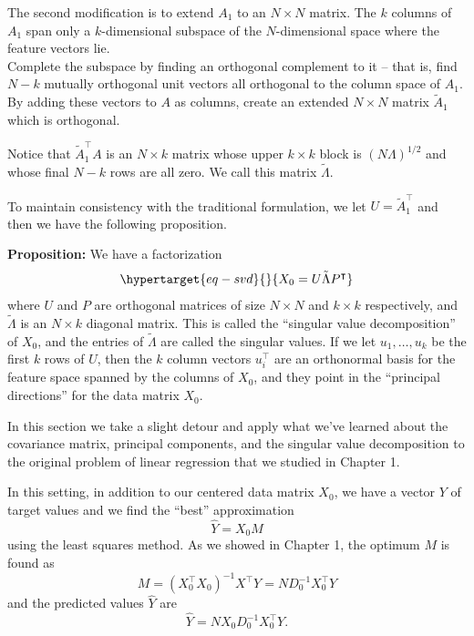 \documentclass[
  11pt,
  letterpaper,
]{scrbook}
\theoremstyle{plain}
\theoremstyle{remark}
\begin{document}
The second modification is to extend \(A_{1}\) to an \(N\times N\)
matrix. The \(k\) columns of \(A_1\) span only a \(k\)-dimensional
subspace of the \(N\)-dimensional space where the feature vectors lie.\\
Complete the subspace by finding an orthogonal complement to it -- that
is, find \(N-k\) mutually orthogonal unit vectors all orthogonal to the
column space of \(A_1\). By adding these vectors to \(A\) as columns,
create an extended \(N\times N\) matrix \(\tilde{A}_1\) which is
orthogonal.

Notice that \(\tilde{A}_{1}^{\intercal}A\) is an \(N\times k\) matrix
whose upper \(k\times k\) block is \((N\Lambda)^{1/2}\) and whose final
\(N-k\) rows are all zero. We call this matrix \(\tilde{\Lambda}\).

To maintain consistency with the traditional formulation, we let
\(U=\tilde{A}_{1}^{\intercal}\) and then we have the following
proposition.

\textbf{Proposition:} We have a factorization
\begin{equation}\protect\hypertarget{eq-svd}{}{
X_{0} = U\tilde{\Lambda}P^{\intercal}
}\label{eq-svd}\end{equation} where \(U\) and \(P\) are orthogonal
matrices of size \(N\times N\) and \(k\times k\) respectively, and
\(\tilde{\Lambda}\) is an \(N\times k\) diagonal matrix. This is called
the ``singular value decomposition'' of \(X_{0}\), and the entries of
\(\tilde{\Lambda}\) are called the singular values. If we let
\(u_1,\ldots, u_k\) be the first \(k\) rows of \(U\), then the \(k\)
column vectors \(u_{i}^{\intercal}\) are an orthonormal basis for the
feature space spanned by the columns of \(X_{0}\), and they point in the
``principal directions'' for the data matrix \(X_{0}\).

In this section we take a slight detour and apply what we've learned
about the covariance matrix, principal components, and the singular
value decomposition to the original problem of linear regression that we
studied in Chapter 1.

In this setting, in addition to our centered data matrix \(X_{0}\), we
have a vector \(Y\) of target values and we find the ``best''
approximation \[
\hat{Y} = X_{0}M
\] using the least squares method. As we showed in Chapter 1, the
optimum \(M\) is found as \[
M = (X_{0}^{\intercal}X_{0})^{-1}X^{\intercal}Y = ND_{0}^{-1}X_0^{\intercal}Y
\] and the predicted values \(\hat{Y}\) are \[
\hat{Y} = NX_{0}D_{0}^{-1}X_0^{\intercal}Y.
\]
\end{document}
